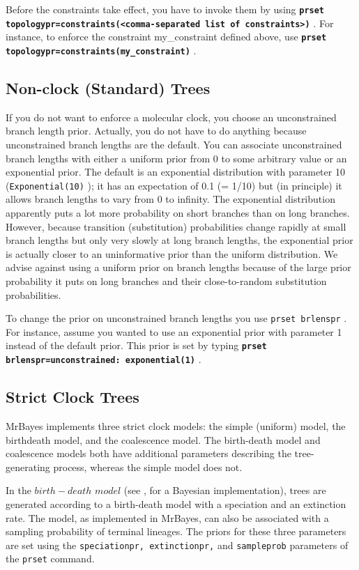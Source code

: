 \documentclass[12pt]{book}
\newcommand{\ttt}[1]{\texttt{#1} }
\newcommand{\tb}[1]{\texttt{\textbf{#1}} }
\begin{document}
Before the constraints take effect, you have to invoke them by using \tb{prset
topologypr=constraints(<comma-separated list of
constraints>)}. For instance, to enforce the constraint my\_constraint defined above,
use \tb{prset topologypr=constraints(my\_constraint)}.

\subsection{Non-clock (Standard) Trees}

If you do not want to enforce a molecular clock, you choose an unconstrained branch
length prior. Actually, you do not have to do anything because unconstrained branch
lengths are the default. You can associate unconstrained branch lengths with either a
uniform prior from 0 to some arbitrary value or an exponential prior. The default is an
exponential distribution with parameter 10 (\ttt{Exponential(10)}); it has an expectation
of 0.1 (= 1/10) but (in principle) it allows branch lengths to vary from 0 to infinity. The
exponential distribution apparently puts a lot more probability on short branches than on
long branches. However, because transition (substitution) probabilities change rapidly at
small branch lengths but only very slowly at long branch lengths, the exponential prior is
actually closer to an uninformative prior than the uniform distribution. We advise against
using a uniform prior on branch lengths because of the large prior probability it puts on
long branches and their close-to-random substitution probabilities.

To change the prior on unconstrained branch lengths you use \ttt{prset brlenspr}. For
instance, assume you wanted to use an exponential prior with parameter 1 instead of the
default prior. This prior is set by typing \tb{prset brlenspr=unconstrained:
exponential(1)}.

\subsection{Strict Clock Trees}

MrBayes implements three strict clock models: the simple (uniform) model, the birthdeath
model, and the coalescence model. The birth-death model and coalescence models
both have additional parameters describing the tree-generating process, whereas the
simple model does not.

In the $birth-death$ $model$ (see \citet{yang97b}, for a Bayesian implementation),
trees are generated according to a birth-death model with a speciation and an extinction
rate. The model, as implemented in MrBayes, can also be associated with a sampling
probability of terminal lineages. The priors for these three parameters are set using the
\ttt{speciationpr, extinctionpr,} and \ttt{sampleprob} parameters of the \ttt{prset}
command.
\end{document}
